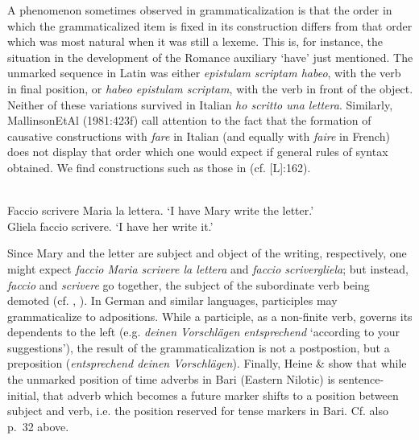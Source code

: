 A phenomenon sometimes observed in grammaticalization is that the order in which the grammaticalized item is fixed in its construction differs from that order which was most natural when it was still a lexeme. This is, for instance, the situation in the development of the Romance auxiliary ‘have’ just mentioned. The unmarked sequence in Latin was either \textit{epistulam scriptam habeo}, with the verb in final position, or \textit{habeo epistulam scriptam}, with the verb in front of the object. Neither of these variations survived in Italian \textit{ho scritto una lettera}. Similarly, MallinsonEtAl (1981:423f) call attention to the fact that the formation of causative constructions with \textit{fare} in Italian (and equally with \textit{faire} in French) does not display that order which one would expect if general rules of syntax obtained. We find constructions such as those in  (cf. \citet{Comrie1981}[L]:162).

\ea\label{ex:}
\langinfo{\LangItal}{}{}\\
 \ea  Faccio scrivere Maria la lettera.
 \glt ‘I have Mary write the letter.’\\
 \ex  Gliela faccio scrivere. 
\glt ‘I have her write it.’\\
\z
\z

Since Mary and the letter are subject and object of the writing, respectively, one might expect \textit{faccio Maria scrivere la lettera} and \textit{faccio scrivergliela}; but instead, \textit{faccio} and \textit{scrivere} go together, the subject of the subordinate verb being demoted (cf. \citet{Comrie1981}, ). In German and similar languages, participles may grammaticalize to adpositions. While a participle, as a non-finite  verb, governs its dependents to the left (e.g. \textit{deinen Vorschlägen entsprechend} ‘according to your suggestions’), the result of the grammaticalization is not a postpostion, but a preposition (\textit{entsprechend deinen Vorschlägen}). Finally, Heine \& \citet[132]{Reh1984} show that while the unmarked position of time adverbs in Bari (Eastern Nilotic) is sentence-initial, that adverb which becomes a future marker shifts to a position between subject and verb, i.e. the position reserved for tense markers in Bari. Cf. also p.~32 above.

